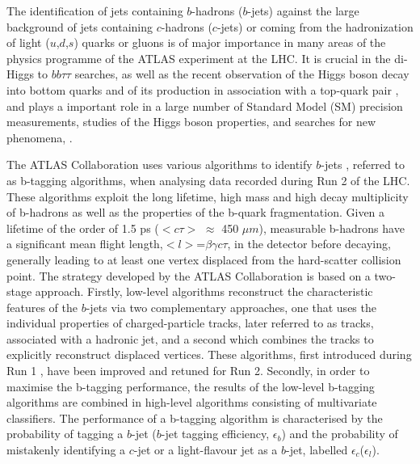 \documentclass[letterpaper,12pt]{article}
\begin{document}
The identification of jets containing $b$-hadrons ($b$-jets) 
against the large background of jets containing $c$-hadrons 
($c$-jets) or coming from the hadronization of light ($u$,$d$,$s$) 
quarks or gluons is of major importance in many areas of the 
physics programme of the ATLAS experiment at the LHC. It is 
crucial in the di-Higgs to $bb\tau\tau$ searches, as well as the recent 
observation of the Higgs boson decay into bottom quarks \parencite{HIGG-2018-04} 
and of its production in association with a top-quark pair \cite{HIGG-2018-13}, 
and plays a important role in a large number of Standard Model (SM) 
precision measurements, studies of the Higgs boson properties, and 
searches for new phenomena\cite{SUSY-2014-08}, \cite{ATLAS-CONF-2018-043} \cite{Interpreting_Higgs_result}.

The ATLAS Collaboration uses various algorithms to identify 
$b$-jets \cite{PERF-2012-04}, referred to as b-tagging algorithms, 
when analysing data recorded during Run 2 of the LHC. These 
algorithms exploit the long lifetime, high mass and high decay 
multiplicity of b-hadrons as well as the properties of the b-quark 
fragmentation. Given a lifetime of the order of 1.5 ps 
($<c\tau>$ $\approx$ 450 $\mu m$), measurable b-hadrons have a 
significant mean flight length,$<l>$=$\beta\gamma c\tau$, in the 
detector before decaying, generally leading to at least one vertex 
displaced from the hard-scatter collision point. The strategy 
developed by the ATLAS Collaboration is based on a two-stage approach. 
Firstly, low-level algorithms reconstruct the characteristic features of 
the $b$-jets via two complementary approaches, one that uses the 
individual properties of charged-particle tracks, later referred 
to as tracks, associated with a hadronic jet, and a second which 
combines the tracks to explicitly reconstruct displaced vertices. 
These algorithms, first introduced during Run 1 \cite{PERF-2012-04}, 
have been improved and retuned for Run 2. Secondly, in order to 
maximise the b-tagging performance, the results of the low-level 
b-tagging algorithms are combined in high-level algorithms 
consisting of multivariate classifiers. The performance of a 
b-tagging algorithm is characterised by the probability of 
tagging a $b$-jet ($b$-jet tagging efficiency, $\epsilon_b$) and 
the probability of mistakenly identifying a $c$-jet or a light-flavour 
jet as a $b$-jet, labelled $\epsilon_c$($\epsilon_l$). 
\end{document}
